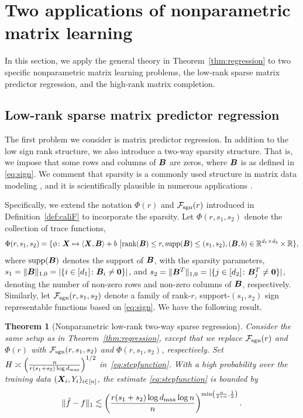 \documentclass[aos]{imsart}
\newtheorem{theorem}{Theorem}%
\theoremstyle{definition}
\def\caliF{\tF_{\textup{sgn}}}
\begin{document}
\section{Two applications of nonparametric matrix learning}
\label{sec:examples}

In this section, we apply the general theory in Theorem~\ref{thm:regression} to two specific nonparametric matrix learning problems, the low-rank sparse matrix predictor regression, and the high-rank matrix completion. 



\subsection{Low-rank sparse matrix predictor regression}
\label{sec:sparse}

The first problem we consider is matrix predictor regression. In addition to the low sign rank structure, we also introduce a two-way sparsity structure. That is, we impose that some rows and columns of $\bm B$ are zeros, where $\bm B$ is as defined in \eqref{eq:sign}. We comment that sparsity is a commonly used structure in matrix data modeling \citep{zhou2014regularized}, and it is scientifically plausible in numerous applications \citep{Zhang2015}.

Specifically, we extend the notation $\Phi(r)$ and $\caliF(r)$ introduced in Definition~\ref{def:caliF} to incorporate the sparsity. Let $\Phi(r,s_1,s_2)$ denote the collection of trace functions, 
\begin{align*} %
\Phi(r,s_1,s_2)=\{\phi\colon \mX\mapsto \langle \mX, \mB \rangle +b \ \big| \text{rank}(\mB)\leq r,  \text{supp}(\mB)\leq (s_1,s_2), (\mB,b)\in\mathbb{R}^{d_1\times d_2}\times \mathbb{R}\},
\end{align*}
where $\text{supp}(\bm B)$ denotes the support of $\bm B$, with the sparsity parameters, $s_1=\lVert\bm B\rVert_{1,0}=|\{i\in[d_1]\colon \bm B_i\neq \mathbf{0}\}|$, and $s_2=\lVert\bm B^T\rVert_{1,0}=|\{j\in[d_2]\colon \bm B^T_j\neq \mathbf{0}\}|$, denoting the number of non-zero rows and non-zero columns of $\bm B$, respectively. Similarly, let $\caliF(r,s_1,s_2)$ denote a family of rank-$r$, support-$(s_1,s_2)$ sign representable functions based on \eqref{eq:sign}. We have the following result. 

\begin{theorem}[Nonparametric low-rank two-way sparse regression]\label{thm:sparse}
Consider the same setup as in Theorem~\ref{thm:regression}, except that we replace $\caliF(r)$ and $\Phi(r)$ with $\caliF(r,s_1,s_2)$ and $\Phi(r,s_1,s_2)$, respectively. Set $H\asymp {\left(n\over r(s_1+s_2)\log d_{\max}\right)}^{1/2}$ in~\eqref{eq:stepfunction}. With a high probability over the training data $(\bm X_i, Y_i)_{i\in[n]}$, the estimate \eqref{eq:stepfunction} is bounded by
\begin{equation}\label{eq:final2}
\onenormSize{}{\hat f- f} \lesssim \left({r(s_1+s_2) \log d_{\max}\log n \over n}\right)^{\min\left({\alpha\over 2+\alpha}, {1\over 2}\right)}.
\end{equation}
\end{theorem}
\end{document}

